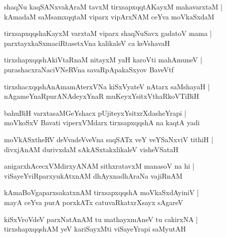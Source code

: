 \documentclass[twoside,12pt,openright]{book}
\newcounter{shloka}[chapter]
\begin{document}
\begin{shloka}%
shaqNu kaqSANxvakAraM tavxM tirxsapxqqtAKayxM mahavarxtaM |\\
kAmadaM saMsamxqqtaM viparx vipArxNAM ceYva moVkaSxdaM 
\end{shloka}

\begin{shloka}%
tirxsapxqqshaKayxM varxtaM viparx shaqNuSavx gadatoV mama |\\
parxtayxkaSxmaciRtasetxVna kalikaleV ca keVshavaH
\end{shloka}

\begin{shloka}%
tirxshapxqqshAkiVtaRnaM nitayxM yaH karoVti mahAmuneV |\\
purashacxraNaciVNeRVna savaRpApakaSxyov BaveVtf
\end{shloka}

\begin{shloka}%
tirxshacxqqshAnAmamAterxVNa kiSxVyateV nAtarx saMshayaH |\\
nAgameYnaRpurANAdeyxYnaR muKeyxYsitxVthaRkoVTiBiH
\end{shloka}

\begin{shloka}%
bahuBiH varxtasaMGeYshacx pUjiteyxYsitxrXdasheYrapi |\\
moVkoSxV Bavati viperxVMdarx tirxsapxqqshA na kaqtA yadi
\end{shloka}

\begin{shloka}%
moVkASxtheRV deVvadeVveVna saqSATx veY veYSaNxviV tithiH |\\
divxjAnAM durivxdaM sAkASxtakxlikaleV visheVSataH
\end{shloka}

\begin{shloka}%
anigarxhAcecxVMdirxyANAM sithxratavxM manasoV na hi |\\
viSayeYviRparxyukAtxnAM dhAyxnadhAraNa vajiRnAM
\end{shloka}

\begin{shloka}%
kAmaBoVgaparxsakatxnAM tirxsapxqqshA moVkaSxdAyiniV |\\
mayA ceYva purA porxkATx catuvaRkatxrXsayx sAgareV
\end{shloka}

\begin{shloka}%
kiSxVroVdeV parxNatAnAM tu mathayxmAneV tu cakirxNA |\\
tirxshapxqqshAM yeV kariSayxMti viSayeYrapi saMyutAH 
\end{shloka}
\end{document}
